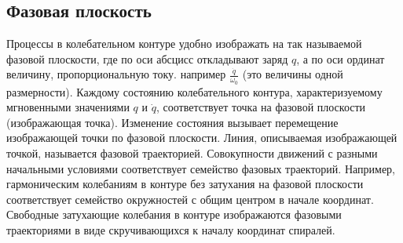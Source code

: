 \subsection{Фазовая плоскость} %

Процессы в колебательном контуре удобно изображать на так называемой фазовой плоскости, где по оси абсцисс откладывают заряд $q$, а по оси ординат величину, пропорциональную току.
например $\frac{\dot{q}}{\omega_0}$ (это величины одной размерности). Каждому
состоянию колебательного контура, характеризуемому мгновенными значениями $q$ и $\dot{q}$, соответствует точка на фазовой плоскости (изображающая точка). Изменение состояния вызывает перемещение изображающей точки по фазовой плоскости. Линия, описываемая изображающей точкой, называется фазовой траекторией. Совокупности движений с разными начальными условиями соответствует семейство фазовых траекторий. Например, гармоническим колебаниям в контуре без затухания  на фазовой плоскости соответствует семейство окружностей с общим центром в начале координат. Свободные затухающие колебания в контуре изображаются фазовыми траекториями в виде скручивающихся к началу координат спиралей.
